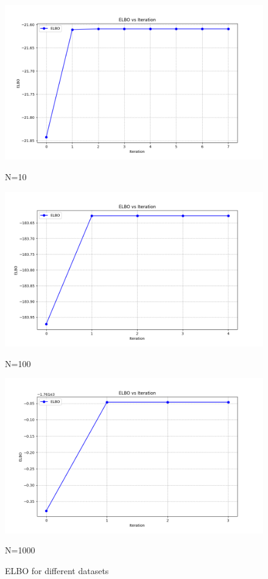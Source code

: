 \documentclass{article}
\begin{document}
\begin{multicols}{2}
    \begin{figure}[H]
        \centering
        \begin{minipage}{0.49\textwidth}
            \centering
            \includegraphics[width=\textwidth]{figures/1.2/elbos_d1.png}
            \caption{N=10}
        \end{minipage}
        \hfill
        \begin{minipage}{0.49\textwidth}
            \centering
            \includegraphics[width=\textwidth]{figures/1.2/elbos_d2.png}
            \caption{N=100}
        \end{minipage}
        \hfill
        \begin{minipage}{0.49\textwidth}
            \centering
            \includegraphics[width=\textwidth]{figures/1.2/elbos_d3.png}
            \caption{N=1000}
        \end{minipage}
        \caption{ELBO for different datasets}\label{fig:elbo}
    \end{figure}


\end{multicols}
\end{document}
